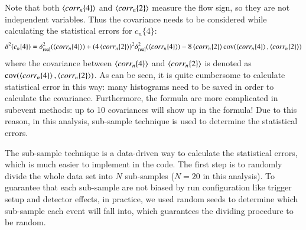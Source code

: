 Note that both $\left\langle corr_n\{4\}\right\rangle$ and $\left\langle corr_n\{2\}\right\rangle$ measure the flow sign, so they are not independent variables. Thus the covariance needs to be considered while calculating the statistical errors for $c_n\{4\}$:
\begin{equation}
\delta^2(c_n\{4\})=\delta^2_\text{real}(\left\langle corr_n\{4\}\right\rangle)+(4\left\langle corr_n\{2\}\right\rangle)^2\delta^2_\text{real}(\left\langle corr_n\{4\}\right\rangle)-8\left\langle corr_n\{2\}\right\rangle\text{cov}(\left\langle corr_n\{4\}\right\rangle,\left\langle corr_n\{2\}\right\rangle)
\end{equation}
where the covariance between $\left\langle corr_n\{4\}\right\rangle$ and $\left\langle corr_n\{2\}\right\rangle$ is denoted as $\text{cov}(\left\langle corr_n\{4\}\right\rangle,\left\langle corr_n\{2\}\right\rangle)$. As can be seen, it is quite cumbersome to calculate statistical error in this way: many histograms need to be saved in order to calculate the covariance. Furthermore, the formula are more complicated in subevent methods: up to 10 covariances will show up in the formula! Due to this reason, in this analysis, sub-sample technique is used to determine the statistical errors.

The sub-sample technique is a data-driven way to calculate the statistical errors, which is much easier to implement in the code. The first step is to randomly divide the whole data set into $N$ sub-samples ($N=20$ in this analysis). To guarantee that each sub-sample are not biased by run configuration like trigger setup and detector effects, in practice, we used random seeds to determine which sub-sample each event will fall into, which guarantees the dividing procedure to be random.


